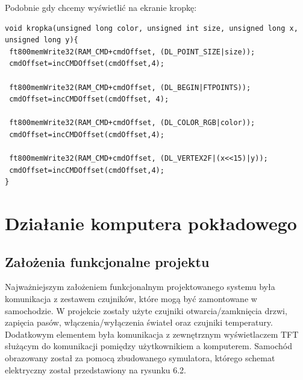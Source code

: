 \documentclass{xmgr}
\begin{document}
Podobnie gdy chcemy wyświetlić na ekranie kropkę:
\begin{lstlisting}[label=bot-dirs-alg,caption=Narysowanie kropki na ekranie]
void kropka(unsigned long color, unsigned int size, unsigned long x, 
unsigned long y){ 
 ft800memWrite32(RAM_CMD+cmdOffset, (DL_POINT_SIZE|size));
 cmdOffset=incCMDOffset(cmdOffset,4);

 ft800memWrite32(RAM_CMD+cmdOffset, (DL_BEGIN|FTPOINTS));
 cmdOffset=incCMDOffset(cmdOffset, 4);

 ft800memWrite32(RAM_CMD+cmdOffset, (DL_COLOR_RGB|color));
 cmdOffset=incCMDOffset(cmdOffset,4);
 
 ft800memWrite32(RAM_CMD+cmdOffset, (DL_VERTEX2F|(x<<15)|y));
 cmdOffset=incCMDOffset(cmdOffset,4);
}
\end{lstlisting}


\chapter{Działanie komputera pokładowego}
\section{Założenia funkcjonalne projektu}
Najważniejszym założeniem funkcjonalnym projektowanego systemu była komunikacja z zestawem czujników, które mogą być zamontowane w samochodzie. W projekcie zostały użyte czujniki otwarcia/zamknięcia drzwi, zapięcia pasów, włączenia/wyłączenia świateł oraz czujniki temperatury. Dodatkowym elementem była komunikacja z zewnętrznym wyświetlaczem TFT służącym do komunikacji pomiędzy użytkownikiem a komputerem. Samochód obrazowany został za pomocą zbudowanego symulatora, którego schemat elektryczny został przedstawiony na rysunku 6.2.
\end{document}
